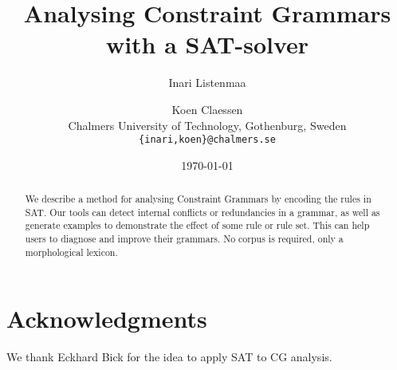 \documentclass[11pt]{article}
\title{Analysing Constraint Grammars with a SAT-solver}
\author{Inari Listenmaa \and Koen Claessen \\
 Chalmers University of Technology, Gothenburg, Sweden \\
 {\tt \{inari,koen\}@chalmers.se} }
\date{\today}
\begin{document}
\maketitle

\begin{abstract}
We describe a method for
 analysing Constraint Grammars by encoding the
rules in SAT.
Our tools can detect internal conflicts or redundancies in a grammar,
as well as generate examples to demonstrate the effect of some rule or
rule set.
This can help users to diagnose and improve their grammars.
No corpus is required, only a morphological lexicon.
\end{abstract}







\section*{Acknowledgments}
We thank Eckhard Bick for the idea to apply SAT to CG analysis. 




\end{document}
